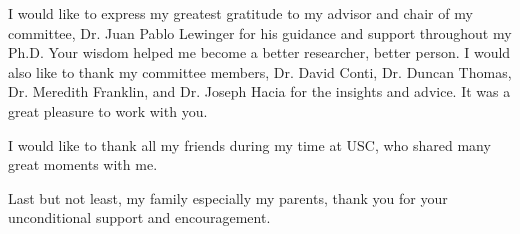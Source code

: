 I would like to express my greatest gratitude to my advisor and chair of my committee, Dr. Juan Pablo Lewinger for his guidance and support throughout my Ph.D. Your wisdom helped me become a better researcher, better person. I would also like to thank my committee members, Dr. David Conti, Dr. Duncan Thomas, Dr. Meredith Franklin, and Dr. Joseph Hacia for the insights and advice. It was a great pleasure to work with you. 

I would like to thank all my friends during my time at USC, who shared many great moments with me.

Last but not least, my family especially my parents, thank you for your unconditional support and encouragement.
